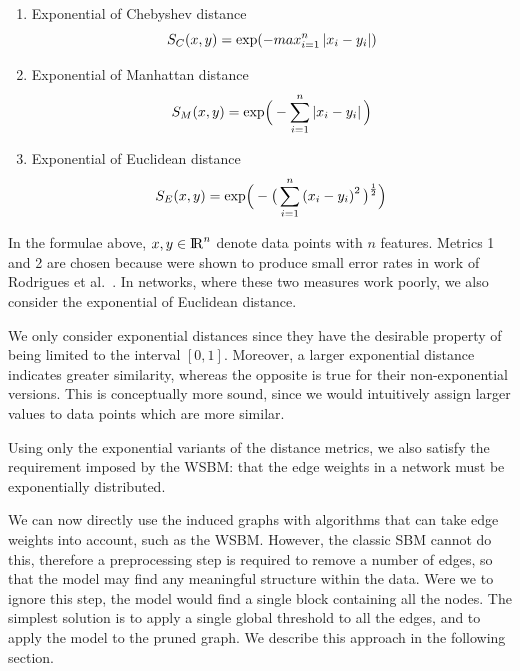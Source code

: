\documentclass[conference]{IEEEtran}
\begin{document}
\begin{enumerate}
    \item Exponential of Chebyshev distance
    $$ S_C(x,y) = {\textnormal{exp}( - max_{i = 1}^n \left | x_i - y_i \right | )} $$

    \item Exponential of Manhattan distance
    $$ S_M(x,y) = \textnormal{exp} \Big ( -\sum_{i=1}^{n} \left | x_i - y_i \right | \Big)$$

    \item Exponential of Euclidean distance
    $$ S_E(x,y) = \textnormal{exp} \Big ( - \big ( \sum_{i=1}^{n} \left ( x_i - y_i \right ) ^2 \big ) ^{\frac{1}{2}} \Big) $$

\end{enumerate}

In the formulae above, $x, y \in {\rm I\!R}^n$ denote data points with $n$ features. Metrics 1 and 2 are chosen because were shown to produce small error rates in work of Rodrigues et al.~\cite{rodrigues2011complex}. In networks, where these two measures work poorly, we also consider the exponential of Euclidean distance.

We only consider exponential distances since they have the desirable property of being limited to the interval $\left [ 0, 1 \right ]$. Moreover, a larger exponential distance indicates greater similarity, whereas the opposite is true for their non-exponential versions. This is conceptually more sound, since we would intuitively assign larger values to data points which are more similar.

Using only the exponential variants of the distance metrics, we also satisfy the requirement imposed by the WSBM: that the edge weights in a network must be exponentially distributed.

We can now directly use the induced graphs with algorithms that can take edge weights into account, such as the WSBM. However, the classic SBM cannot do this, therefore a preprocessing step is required to remove a number of edges, so that the model may find any meaningful structure within the data. Were we to ignore this step, the model would find a single block containing all the nodes. The simplest solution is to apply a single global threshold to all the edges, and to apply the model to the pruned graph. We describe this approach in the following section.
\end{document}
